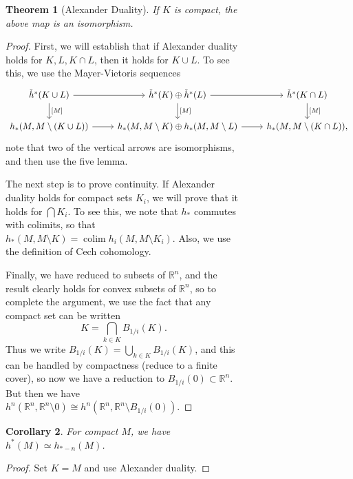 \documentclass[leqno, openany]{memoir}
\newtheorem{thm}{Theorem}[section]
\newtheorem{cor}[thm]{Corollary}
\theoremstyle{definition}
\theoremstyle{remark}
\theoremstyle{plain}
\theoremstyle{definition}
\theoremstyle{remark}
\newcommand{\R}{\mathbb{R}}
\begin{document}
\begin{figure}[H]
\begin{figure}[H]
\begin{thm}[Alexander Duality] If $K$ is compact, the above map is an
isomorphism.  \end{thm}

\begin{proof} First, we will establish that if Alexander duality holds for $K,
    L, K \cap L$, then it holds for $K \cup L$. To see this, we use the
    Mayer-Vietoris sequences \begin{equation*} \begin{tikzcd} \check{h}^*(K
        \cup L) \arrow{r} \arrow{d}{{[M]}} & \check{h}^*(K) \oplus
        \check{h}^*(L) \arrow{r} \arrow{d}{{[M]}} & \check{h}^*(K \cap L)
        \arrow{d}{{[M]}} \\ h_*(M, M \setminus (K \cup L)) \arrow{r} & h_*(M, M
    \setminus K) \oplus h_*(M, M \setminus L) \arrow{r} & h_*(M, M \setminus (K
\cap L)), \end{tikzcd} \end{equation*} note that two of the vertical arrows are
isomorphisms, and then use the five lemma.

    The next step is to prove continuity. If Alexander duality holds for
    compact sets $K_i$, we will prove that it holds for $\bigcap K_i$. To see
    this, we note that $h_*$ commutes with colimits, so that $h_*(M, M
    \setminus K) = \operatorname{colim} h_i(M, M \setminus K_i)$. Also, we use
    the definition of Cech cohomology.

    Finally, we have reduced to subsets of $\R^n$, and the result clearly holds
    for convex subsets of $\R^n$, so to complete the argument, we use the fact
    that any compact set can be written \[ K = \bigcap_{k \in K} B_{1/i}(K). \]
    Thus we write $B_{1/i}(K) = \bigcup_{k \in K} B_{1/i}(K)$, and this can be
    handled by compactness (reduce to a finite cover), so now we have a
    reduction to $B_{1/i}(0) \subset \R^n$. But then we have $h^n(\R^n, \R^n
    \setminus 0) \cong h^n(\R^n, \R^n \setminus B_{1/i}(0))$.  \end{proof}

\begin{cor} For compact $M$, we have $h^*(M) \simeq h_{*-n}(M)$.  \end{cor}

\begin{proof} Set $K = M$ and use Alexander duality.  \end{proof}


\end{figure}
\end{figure}
\end{document}
